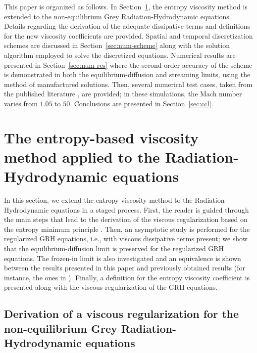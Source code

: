 \documentclass[review]{elsarticle}
\newcommand{\sect}[1]{Section~\ref{#1}}                     %
\begin{document}
This paper is organized as follows. In \sect{sec:entropy-visc-meth}, the entropy viscosity method is extended to the non-equilibrium Grey Radiation-Hydrodynamic equations. Details regarding the derivation of the adequate dissipative terms and definitions for the new viscosity coefficients are provided. Spatial and temporal discretization schemes are discussed in \sect{sec:num-scheme} along with the solution algorithm employed to solve the discretized equations. Numerical results are presented in \sect{sec:num-res} where the second-order accuracy of the scheme is demonstrated in both the equilibrium-diffusion and streaming limits, using the method of manufactured solutions. Then, several numerical test cases, taken from the published literature \cite{LowrieEdwards}, are provided; in these simulations, the Mach number varies from $1.05$ to $50$. Conclusions are presented in \sect{sec:ccl}.

\section{The entropy-based viscosity method applied to the Radiation-Hydrodynamic equations}
\label{sec:entropy-visc-meth}

In this section, we extend the entropy viscosity method \cite{jlg1, jlg2, valentin} to the Radiation-Hydrodynamic equations in a staged process. First, the reader is guided through the main steps that lead to the derivation of the viscous regularization based on the entropy minimum principle \cite{entropy}. Then, an asymptotic study is performed for the regularized GRH equations, i.e., with viscous dissipative terms present; we show that the equilibrium-diffusion limit is preserved for the regularized GRH equations. The frozen-in limit is also investigated and an equivalence is shown between the results presented in this paper and previously obtained results (for instance, the ones in \cite{LowrieMorel}). Finally, a definition for the entropy viscosity coefficient is presented along with the viscous regularization of the GRH equations.
 
\subsection{Derivation of a viscous regularization for the non-equilibrium Grey Radiation-Hydrodynamic equations}\label{sec:visc-reg}
\end{document}
